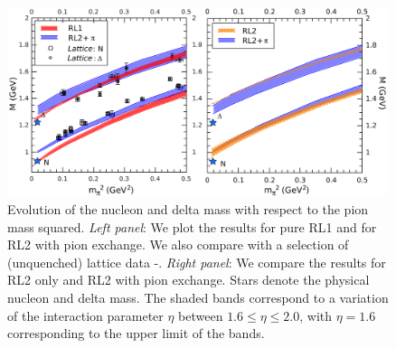 \begin{figure}[t]
\begin{center}
  \includegraphics[width=0.99\textwidth]{figures/eta-bands}
 \end{center}
 \caption{Evolution of the nucleon and delta mass with respect to the pion mass squared. \textit{Left panel}: We plot the results for pure RL1 and for RL2 with pion exchange. We also compare with a selection of (unquenched) 
lattice data \cite{Alexandrou:2006ru}-\cite{Gattringer:2008vj}. \textit{Right panel}: We compare the results for RL2 only and RL2 with pion exchange. Stars denote the physical nucleon and delta mass.
The shaded bands correspond to a variation of the interaction parameter $\eta$ between
$1.6 \le \eta \le 2.0$, with $\eta=1.6$ corresponding to the upper limit of the bands.}\label{fig:mass_panel}
\end{figure}

